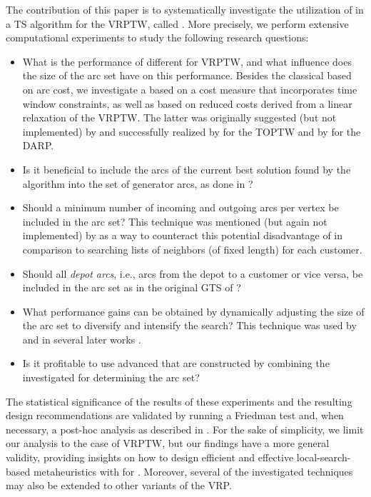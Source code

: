 \documentclass[11pt,a4paper,fleqn]{article}
\begin{document}
The contribution of this paper is to systematically investigate the utilization of \gns in a TS algorithm for the VRPTW, called \tsnew. More precisely, we perform extensive computational experiments to study the following research questions:
\begin{itemize}
\item What is the performance of different \sms for VRPTW, and what influence does the size of the \reduced arc set have on this performance. Besides the classical \sm based on arc cost, we investigate a \sm based on a cost measure that incorporates time window constraints, as well as \sms based on reduced costs derived from a linear relaxation of the VRPTW. The latter was originally suggested (but not implemented) by \citet{toth:03} and successfully realized by \citet{labadie:12} for the TOPTW and by \citet{kirchler:13} for the DARP. 
\item Is it beneficial to include the arcs of the current best solution found by the algorithm into the \reduced set of generator arcs, as done in \citet{toth:03}? \item Should a minimum number of  incoming and outgoing arcs per vertex be included in the \reduced arc set? This technique was mentioned (but again not implemented) by \citet{toth:03} as a way to counteract this potential disadvantage of \gns in comparison to searching \reduced lists of neighbors (of fixed length) for each customer.
\item Should all \emph{depot arcs}, i.e., arcs from the depot to a customer or vice versa, be included in the \reduced arc set  as in the original GTS of \citet{toth:03}?
\item What performance gains can be obtained by dynamically adjusting the size of the \reduced arc set  to diversify and intensify the search? This technique was used by \citet{toth:03} and in several later works \citep{prins:07,branchini:09,labadie:12,escobar:13,kirchler:13,escobar:14,escobar:14:mdvrp}.
\item Is it profitable  to use advanced \sms that are constructed by combining the investigated \standalone \sms for determining the \reduced arc set?
\end{itemize}
The statistical significance of the results of these experiments and the resulting design recommendations are validated by running a Friedman test and, when necessary, a post-hoc analysis as described in \citet{vidal:15}. For the sake of simplicity, we limit our analysis to the case of VRPTW, but our findings have a more general validity, providing insights on how to design efficient and effective local-search-based metaheuristics with \gns for \problemClassShortS. Moreover, several of the investigated techniques may also be extended to other variants of the VRP. 
\end{document}

